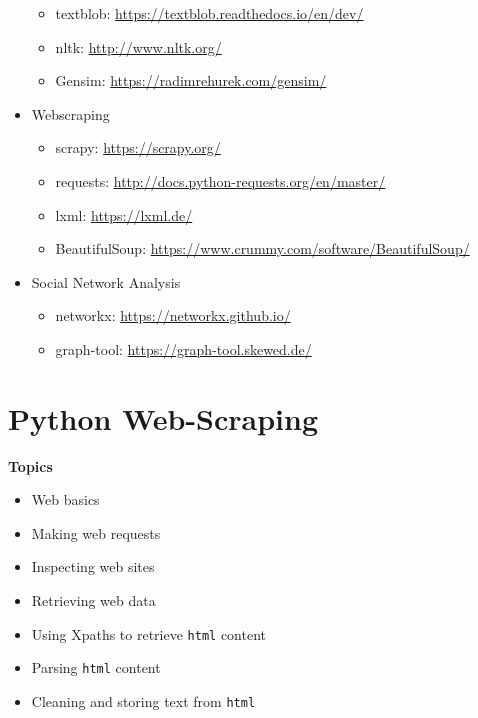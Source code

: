 \documentclass[
]{book}
\providecommand{\tightlist}{%
  \setlength{\itemsep}{0pt}\setlength{\parskip}{0pt}}
\begin{document}
\begin{itemize}
  \begin{itemize}
  \tightlist
  \item
    textblob: \url{https://textblob.readthedocs.io/en/dev/}
  \item
    nltk: \url{http://www.nltk.org/}
  \item
    Gensim: \url{https://radimrehurek.com/gensim/}
  \end{itemize}
\item
  Webscraping

  \begin{itemize}
  \tightlist
  \item
    scrapy: \url{https://scrapy.org/}
  \item
    requests: \url{http://docs.python-requests.org/en/master/}
  \item
    lxml: \url{https://lxml.de/}
  \item
    BeautifulSoup: \url{https://www.crummy.com/software/BeautifulSoup/}
  \end{itemize}
\item
  Social Network Analysis

  \begin{itemize}
  \tightlist
  \item
    networkx: \url{https://networkx.github.io/}
  \item
    graph-tool: \url{https://graph-tool.skewed.de/}
  \end{itemize}
\end{itemize}

\hypertarget{python-web-scraping}{%
\chapter{Python Web-Scraping}\label{python-web-scraping}}

\textbf{Topics}

\begin{itemize}
\tightlist
\item
  Web basics
\item
  Making web requests
\item
  Inspecting web sites
\item
  Retrieving web data
\item
  Using Xpaths to retrieve \texttt{html} content
\item
  Parsing \texttt{html} content
\item
  Cleaning and storing text from \texttt{html}
\end{itemize}
\end{document}
